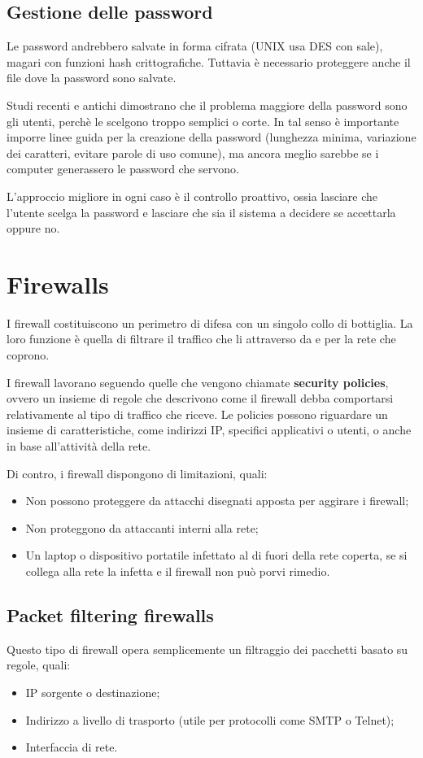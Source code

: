 \documentclass[a4paper, 10pt, twoside]{article}
\begin{document}
	\subsection{Gestione delle password}
	Le password andrebbero salvate in forma cifrata (UNIX usa DES con sale), magari con funzioni hash crittografiche. Tuttavia è necessario proteggere anche il file dove la password sono salvate.

	Studi recenti e antichi dimostrano che il problema maggiore della password sono gli utenti, perchè le scelgono troppo semplici o corte. In tal senso è importante imporre linee guida per la creazione della password (lunghezza minima, variazione dei caratteri, evitare parole di uso comune), ma ancora meglio sarebbe se i computer generassero le password che servono.

	L'approccio migliore in ogni caso è il controllo proattivo, ossia lasciare che l'utente scelga la password e lasciare che sia il sistema a decidere se accettarla oppure no.

	\section{Firewalls}
	I firewall costituiscono un perimetro di difesa con un singolo collo di bottiglia. La loro funzione è quella di filtrare il traffico che li attraverso da e per la rete che coprono.

	I firewall lavorano seguendo quelle che vengono chiamate \textbf{security policies}, ovvero un insieme di regole che descrivono come il firewall debba comportarsi relativamente al tipo di traffico che riceve. Le policies possono riguardare un insieme di caratteristiche, come indirizzi IP, specifici applicativi o utenti, o anche in base all'attività della rete.

	Di contro, i firewall dispongono di limitazioni, quali: \begin{itemize}
		\item Non possono proteggere da attacchi disegnati apposta per aggirare i firewall;
		\item Non proteggono da attaccanti interni alla rete;
		\item Un laptop o dispositivo portatile infettato al di fuori della rete coperta, se si collega alla rete la infetta e il firewall non può porvi rimedio.
	\end{itemize}

	\subsection{Packet filtering firewalls}
	Questo tipo di firewall opera semplicemente un filtraggio dei pacchetti basato su regole, quali: \begin{itemize}
		\item IP sorgente o destinazione;
		\item Indirizzo a livello di trasporto (utile per protocolli come SMTP o  Telnet);
		\item Interfaccia di rete.
	\end{itemize}
\end{document}
